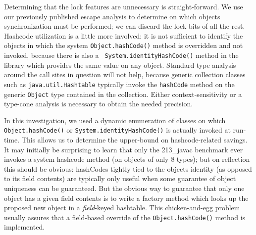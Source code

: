 \documentclass[preprint]{acmconf}
\begin{document}
Determining that the lock features are unnecessary is straight-forward.
We use our previously published escape analysis
\cite{salcianu01,vivien01,whaley99}
to determine on which objects synchronization must be performed; we
can discard the lock bits of all the rest.  Hashcode utilization
is a little more involved: it is not sufficient to identify the
objects in which the system {\tt Object.hashCode()} method is
overridden and not invoked, because there is also a {\tt
  System.identityHashCode()} method in the library which provides the
same value on any object.  Standard type analysis around the
call sites in question will not help, because generic collection
classes such as {\tt java.util.Hashtable} typically invoke
the {\tt hashCode} method on the generic {\tt Object} type contained
in the collection.  Either context-sensitivity or a type-cone analysis
is necessary to obtain the needed precision.

In this investigation, we used a dynamic enumeration of classes on
which {\tt Object.hashCode()} or {\tt System.identityHashCode()} is
actually invoked at run-time.  This allows us to determine the
upper-bound on hashcode-related savings.  It may initially be
surprising to learn that only the 213\_javac benchmark ever invokes a
system hashcode method (on objects of only 8 types); but on reflection
this should be obvious: hashCodes tightly tied to the objects identity
(as opposed to its field contents) are typically only useful when some
guarantee of object uniqueness can be guaranteed.  But the obvious way
to guarantee that only one object has a given field contents is to
write a factory method which looks up the proposed new object in a
{\it field}-keyed hashtable.  This chicken-and-egg problem usually
assures that a field-based override of the {\tt Object.hashCode()}
method is implemented.
\end{document}
